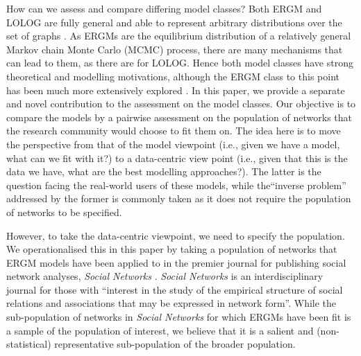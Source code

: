 \documentclass[
]{statsoc}
\begin{document}
How can we assess and compare differing model classes? Both ERGM and
LOLOG are fully general and able to represent arbitrary distributions
over the set of graphs \citep[][Theorem 1]{Fellows2018}. As ERGMs are
the equilibrium distribution of a relatively general Markov chain Monte
Carlo (MCMC) process, there are many mechanisms that can lead to them,
as there are for LOLOG. Hence both model classes have strong theoretical
and modelling motivations, although the ERGM class to this point has
been much more extensively explored
\citep{schweinberger2020,Schweinberger2017ExponentialFamilyMO}. In this
paper, we provide a separate and novel contribution to the assessment on
the model classes. Our objective is to compare the models by a pairwise
assessment on the population of networks that the research community
would choose to fit them on. The idea here is to move the perspective
from that of the model viewpoint (i.e., given we have a model, what can
we fit with it?) to a data-centric view point (i.e., given that this is
the data we have, what are the best modelling approaches?). The latter
is the question facing the real-world users of these models, while
the``inverse problem'' addressed by the former is commonly taken as it
does not require the population of networks to be specified.

However, to take the data-centric viewpoint, we need to specify the
population. We operationalised this in this paper by taking a population
of networks that ERGM models have been applied to in the premier journal
for publishing social network analyses, \textit{Social Networks}
\citep{socialnetworks}. \textit{Social Networks} is an interdisciplinary
journal for those with ``interest in the study of the empirical
structure of social relations and associations that may be expressed in
network form''. While the sub-population of networks in
\textit{Social Networks} for which ERGMs have been fit is a sample of
the population of interest, we believe that it is a salient and
(non-statistical) representative sub-population of the broader
population.
\end{document}

